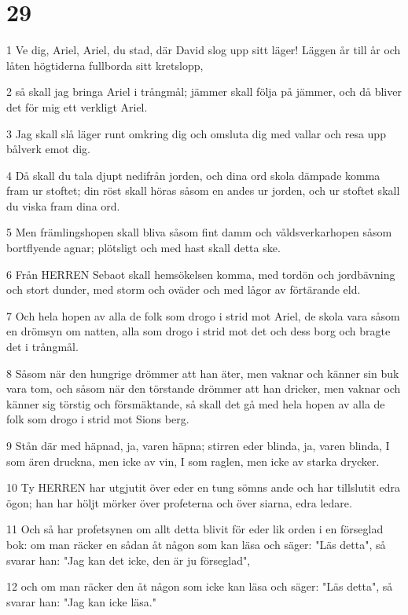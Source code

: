 \chapter{29}

\par 1 Ve dig, Ariel, Ariel, du stad, där David slog upp sitt läger! Läggen år till år och låten högtiderna fullborda sitt kretslopp,
\par 2 så skall jag bringa Ariel i trångmål; jämmer skall följa på jämmer, och då bliver det för mig ett verkligt Ariel.
\par 3 Jag skall slå läger runt omkring dig och omsluta dig med vallar och resa upp bålverk emot dig.
\par 4 Då skall du tala djupt nedifrån jorden, och dina ord skola dämpade komma fram ur stoftet; din röst skall höras såsom en andes ur jorden, och ur stoftet skall du viska fram dina ord.
\par 5 Men främlingshopen skall bliva såsom fint damm och våldsverkarhopen såsom bortflyende agnar; plötsligt och med hast skall detta ske.
\par 6 Från HERREN Sebaot skall hemsökelsen komma, med tordön och jordbävning och stort dunder, med storm och oväder och med lågor av förtärande eld.
\par 7 Och hela hopen av alla de folk som drogo i strid mot Ariel, de skola vara såsom en drömsyn om natten, alla som drogo i strid mot det och dess borg och bragte det i trångmål.
\par 8 Såsom när den hungrige drömmer att han äter, men vaknar och känner sin buk vara tom, och såsom när den törstande drömmer att han dricker, men vaknar och känner sig törstig och försmäktande, så skall det gå med hela hopen av alla de folk som drogo i strid mot Sions berg.
\par 9 Stån där med häpnad, ja, varen häpna; stirren eder blinda, ja, varen blinda, I som ären druckna, men icke av vin, I som raglen, men icke av starka drycker.
\par 10 Ty HERREN har utgjutit över eder en tung sömns ande och har tillslutit edra ögon; han har höljt mörker över profeterna och över siarna, edra ledare.
\par 11 Och så har profetsynen om allt detta blivit för eder lik orden i en förseglad bok: om man räcker en sådan åt någon som kan läsa och säger: "Läs detta", så svarar han: "Jag kan det icke, den är ju förseglad",
\par 12 och om man räcker den åt någon som icke kan läsa och säger: "Läs detta", så svarar han: "Jag kan icke läsa."
